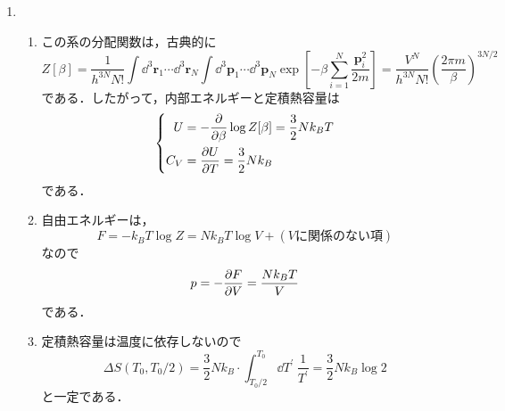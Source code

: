 \documentclass[a4paper,pdflatex,ja=standard]{bxjsarticle}
\begin{document}
\begin{enumerate}
  \item 
  \begin{enumerate}
    \item 
    この系の分配関数は，古典的に
    \begin{equation}
      Z[\beta]
      =
      \frac{1}{h^{3N}N!}
      \int\dd^3 \bm{r}_{1}\cdots\dd^3 \bm{r}_{N}
      \int\dd^3 \bm{p}_{1}\cdots\dd^3 \bm{p}_{N}
      \exp\left[ -\beta\sum_{i=1}^{N}\frac{\bm{p}_{i}^{2}}{2m} \right]  
      =
      \frac{V^{N}}{h^{3N}N!}
      \left( \frac{2\pi m}{\beta} \right)^{3N/2}
    \end{equation}
    である．したがって，内部エネルギーと定積熱容量は
    \begin{equation}
      \left\{
        \begin{alignedat}{1}
          U
          &=
          -\pdv{}{\beta}
          \log Z[\beta]
          =
          \frac{3}{2}Nk_{B}T
          \\
          C_{V}
          &=
          \pdv{U}{T}
          =
          \frac{3}{2}Nk_{B}
        \end{alignedat}
      \right.
    \end{equation}
    である．

    \item 
    自由エネルギーは，
    \begin{equation}
      F
      =
      -k_{B}T\log Z
      =
      Nk_{B}T\log V
      +
      (\text{$V$に関係のない項})
    \end{equation}
    なので
    \begin{equation}
      p
      =
      -\pdv{F}{V}
      =
      \frac{Nk_{B}T}{V}
    \end{equation}
    である．

    \item 
    定積熱容量は温度に依存しないので
    \begin{equation}
      \Delta
      S(T_{0},T_{0}/2)
      =
      \frac{3}{2}Nk_{B}\cdot
      \int_{T_{0}/2}^{T_{0}}
      \dd T^{\prime}\ 
      \frac{1}{T^{\prime}}
      =
      \frac{3}{2}Nk_{B}\log 2
    \end{equation}
    と一定である．

  \end{enumerate}


\end{enumerate}
\end{document}
